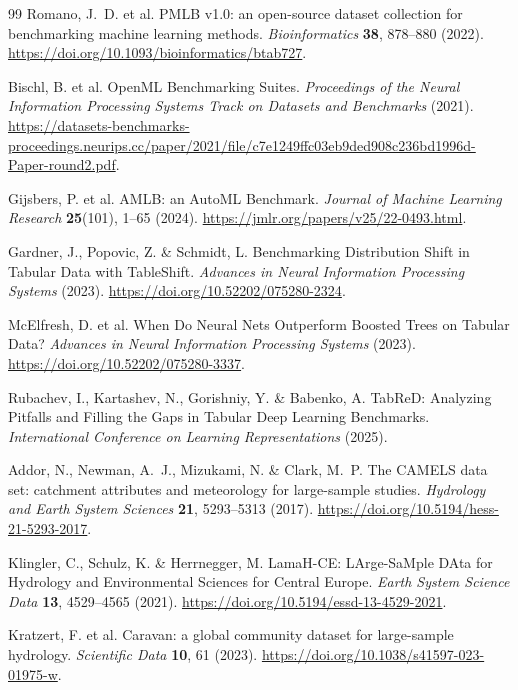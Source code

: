 \documentclass[10pt,a4paper]{article}
\begin{document}
\begin{thebibliography}{99}
Romano, J.~D. et al. PMLB v1.0: an open-source dataset collection for
benchmarking machine learning methods. \emph{Bioinformatics} \textbf{38},
878--880 (2022). \url{https://doi.org/10.1093/bioinformatics/btab727}.

Bischl, B. et al. OpenML Benchmarking Suites. \emph{Proceedings of the
Neural Information Processing Systems Track on Datasets and Benchmarks}
(2021). \url{https://datasets-benchmarks-proceedings.neurips.cc/paper/2021/file/c7e1249ffc03eb9ded908c236bd1996d-Paper-round2.pdf}.

Gijsbers, P. et al. AMLB: an AutoML Benchmark. \emph{Journal of Machine
Learning Research} \textbf{25}(101), 1--65 (2024).
\url{https://jmlr.org/papers/v25/22-0493.html}.

Gardner, J., Popovic, Z. \& Schmidt, L. Benchmarking Distribution Shift
in Tabular Data with TableShift. \emph{Advances in Neural Information
Processing Systems} (2023).
\url{https://doi.org/10.52202/075280-2324}.

McElfresh, D. et al. When Do Neural Nets Outperform Boosted Trees on
Tabular Data? \emph{Advances in Neural Information Processing Systems}
(2023). \url{https://doi.org/10.52202/075280-3337}.

Rubachev, I., Kartashev, N., Gorishniy, Y. \& Babenko, A. TabReD:
Analyzing Pitfalls and Filling the Gaps in Tabular Deep Learning
Benchmarks. \emph{International Conference on Learning Representations}
(2025).

Addor, N., Newman, A.~J., Mizukami, N. \& Clark, M.~P. The CAMELS
data set: catchment attributes and meteorology for large-sample
studies. \emph{Hydrology and Earth System Sciences} \textbf{21},
5293--5313 (2017).
\url{https://doi.org/10.5194/hess-21-5293-2017}.

Klingler, C., Schulz, K. \& Herrnegger, M. LamaH-CE: LArge-SaMple DAta
for Hydrology and Environmental Sciences for Central Europe.
\emph{Earth System Science Data} \textbf{13}, 4529--4565 (2021).
\url{https://doi.org/10.5194/essd-13-4529-2021}.

Kratzert, F. et al. Caravan: a global community dataset for
large-sample hydrology. \emph{Scientific Data} \textbf{10}, 61
(2023). \url{https://doi.org/10.1038/s41597-023-01975-w}.


\end{thebibliography}
\end{document}
